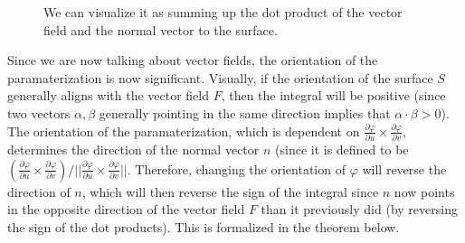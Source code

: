 \begin{definition}
\begin{figure}[H]
			\caption{We can visualize it as summing up the dot product of the vector field and the normal vector to the surface. } 
			\label{fig:vector_surface_integral}
		\end{figure}
  \end{definition}
		
  Since we are now talking about vector fields, the orientation of the paramaterization is now significant. Visually, if the orientation of the surface $S$ generally aligns with the vector field $F$, then the integral will be positive (since two vectors $\alpha, \beta$ generally pointing in the same direction implies that $\alpha \cdot \beta > 0$). The orientation of the paramaterization, which is dependent on $\frac{\partial \varphi}{\partial u} \times \frac{\partial \varphi}{\partial v}$, determines the direction of the normal vector $n$ (since it is defined to be $(\frac{\partial \varphi}{\partial u} \times \frac{\partial \varphi}{\partial v}) / \big|\big|\frac{\partial \varphi}{\partial u} \times \frac{\partial \varphi}{\partial v}\big|\big|$. Therefore, changing the orientation of $\varphi$ will reverse the direction of $n$, which will then reverse the sign of the integral since $n$ now points in the opposite direction of the vector field $F$ than it previously did (by reversing the sign of the dot products). This is formalized in the theorem below. 
		
